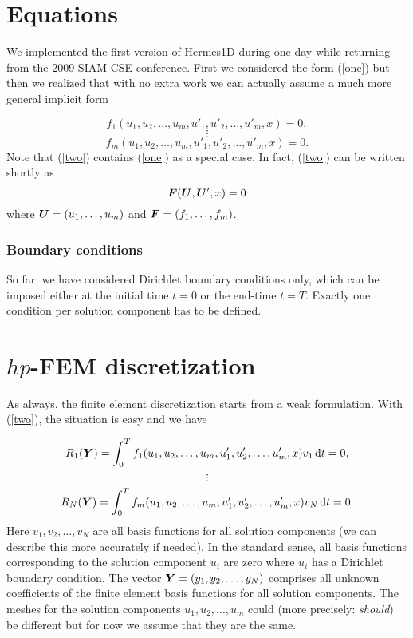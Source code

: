 \documentclass[12pt]{article}
\newcommand{\bfF}{\mbox{\boldmath $F$}}
\newcommand{\bfU}{\mbox{\boldmath $U$}}
\newcommand{\bfY}{\mbox{\boldmath $Y$}}
\def\be{\begin{equation}}
\def\ee{\end{equation}}
\def\d{\mbox{d}}
\begin{document}
\section{Equations}

We implemented the first version of Hermes1D during one day while 
returning from the 2009 SIAM CSE conference. First we considered the 
form (\ref{one}) but then we realized that with no extra work we can actually 
assume a much more general implicit form

$$
f_1(u_1, u_2, \ldots, u_m, u'_1, u'_2, \ldots, u'_m, x) = 0,
$$
\be\label{two}
\vdots
\ee
$$
f_m(u_1, u_2, \ldots, u_m, u'_1, u'_2, \ldots, u'_m, x) = 0.
$$
Note that (\ref{two}) contains (\ref{one}) as a special case.
In fact, (\ref{two}) can be written shortly as 
\be\label{qqq}
\bfF(\bfU, \bfU', x) = 0
\ee
where ${\bfU} = (u_1,\dots,u_m)$ and ${\bfF} = (f_1,\dots,f_m)$. 

\subsubsection*{Boundary conditions}

So far, we 
have considered Dirichlet boundary conditions only, which can be imposed
either at the initial time $t = 0$ or the end-time $t = T$. Exactly one 
condition per solution component has to be defined.



\section{$hp$-FEM discretization}

As always, the finite element discretization starts from a weak formulation.
With (\ref{two}), the situation is easy and we have 

$$
R_1(\bfY) = \int_0^T f_1(u_1, u_2, \ldots, u_m, u'_1, u'_2, \ldots, u'_m, x)v_1 \, \d t = 0,
$$
\be\label{three}
\vdots
\ee
$$
R_N(\bfY) = \int_0^T f_m(u_1, u_2, \ldots, u_m, u'_1, u'_2, \ldots, u'_m, x)v_N \, \d t = 0.
$$
Here $v_1, v_2, \ldots, v_N$ are all basis functions for all solution components
(we can describe this more accurately if needed).
In the standard sense, all basis functions corresponding to the solution component $u_i$ 
are zero where $u_i$ has a Dirichlet boundary condition.
The vector $\bfY = (y_1, y_2, \ldots, y_N)$ comprises all unknown coefficients 
of the finite element basis functions for all solution components. The meshes
for the solution components $u_1, u_2, \ldots, u_m$ could (more precisely: {\em should})
be different but for now we assume that they are the same. 
\end{document}
